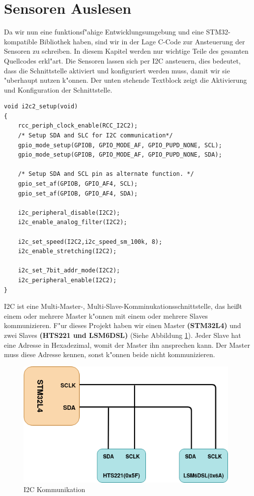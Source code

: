 \section{Sensoren Auslesen} \label{Sensoren}

Da wir nun eine funktionsf"ahige Entwicklungsumgebung und eine 
STM32-kompatible Bibliothek haben, sind wir in der Lage C-Code zur 
Ansteuerung der Sensoren zu schreiben. In diesem Kapitel werden nur 
wichtige Teile des gesamten Quellcodes erkl"art. Die Sensoren lassen 
sich per I2C ansteuern, dies bedeutet, dass die Schnittstelle aktiviert 
und konfiguriert werden muss, damit wir sie "uberhaupt nutzen k"onnen. 
Der unten stehende Textblock zeigt die Aktivierung und Konfiguration der Schnittstelle.

\begin{lstlisting}[frame=single]
void i2c2_setup(void)
{
	rcc_periph_clock_enable(RCC_I2C2);
	/* Setup SDA and SLC for I2C communication*/
	gpio_mode_setup(GPIOB, GPIO_MODE_AF, GPIO_PUPD_NONE, SCL);
	gpio_mode_setup(GPIOB, GPIO_MODE_AF, GPIO_PUPD_NONE, SDA);

	/* Setup SDA and SCL pin as alternate function. */
	gpio_set_af(GPIOB, GPIO_AF4, SCL);
	gpio_set_af(GPIOB, GPIO_AF4, SDA);

	i2c_peripheral_disable(I2C2);
	i2c_enable_analog_filter(I2C2);

	i2c_set_speed(I2C2,i2c_speed_sm_100k, 8);
	i2c_enable_stretching(I2C2);

	i2c_set_7bit_addr_mode(I2C2);
	i2c_peripheral_enable(I2C2);
}

\end{lstlisting}

I2C ist eine Multi-Master-, Multi-Slave-Komminukationsschnittstelle, 
das hei\ss{}t einem oder mehrere Master k"onnen mit einem oder mehrere 
Slaves  kommunizieren. F"ur dieses Projekt haben wir einen Master 
\textbf{(STM32L4)} und zwei Slaves  \textbf{(HTS221 und LSM6DSL)} 
(Siehe Abbildung \ref{fig:I2C}). 
Jeder Slave hat eine Adresse in Hexadezimal, womit der Master ihn 
ansprechen kann. Der Master muss diese Adresse kennen, sonst k"onnen 
beide nicht kommunizieren. 

\begin{figure}[h]
	\centering
	\includegraphics[width=11cm]{source/images/I2C}
	\caption{I2C Kommunikation\label{fig:I2C}}
\end{figure}

